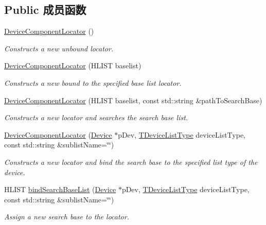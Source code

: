 \subsection*{Public 成员函数}
\begin{DoxyCompactItemize}
\item 
\hypertarget{classmv_i_m_p_a_c_t_1_1acquire_1_1_device_component_locator_a00b45d983915c661f03a7892c25824f1}{\hyperlink{classmv_i_m_p_a_c_t_1_1acquire_1_1_device_component_locator_a00b45d983915c661f03a7892c25824f1}{Device\+Component\+Locator} ()}\label{classmv_i_m_p_a_c_t_1_1acquire_1_1_device_component_locator_a00b45d983915c661f03a7892c25824f1}

\begin{DoxyCompactList}\small\item\em Constructs a new unbound locator. \end{DoxyCompactList}\item 
\hyperlink{classmv_i_m_p_a_c_t_1_1acquire_1_1_device_component_locator_a8db2e7b26c4c9a085d1b62fd2d0d72f2}{Device\+Component\+Locator} (H\+L\+I\+S\+T baselist)
\begin{DoxyCompactList}\small\item\em Constructs a new bound to the specified base list locator. \end{DoxyCompactList}\item 
\hyperlink{classmv_i_m_p_a_c_t_1_1acquire_1_1_device_component_locator_a8c467c39ece5e330e2ac77a0c0b1477c}{Device\+Component\+Locator} (H\+L\+I\+S\+T baselist, const std\+::string \&path\+To\+Search\+Base)
\begin{DoxyCompactList}\small\item\em Constructs a new locator and searches the search base list. \end{DoxyCompactList}\item 
\hyperlink{classmv_i_m_p_a_c_t_1_1acquire_1_1_device_component_locator_aa5bbd8bef10129bc482813c7c6210e1e}{Device\+Component\+Locator} (\hyperlink{classmv_i_m_p_a_c_t_1_1acquire_1_1_device}{Device} $\ast$p\+Dev, \hyperlink{group___common_interface_ga0dca79bbf0803a4ecec16d6cbb1a3dbb}{T\+Device\+List\+Type} device\+List\+Type, const std\+::string \&sublist\+Name=\char`\"{}\char`\"{})
\begin{DoxyCompactList}\small\item\em Constructs a new locator and bind the search base to the specified list type of the device. \end{DoxyCompactList}\item 
H\+L\+I\+S\+T \hyperlink{classmv_i_m_p_a_c_t_1_1acquire_1_1_device_component_locator_af77f54da12e74ce5100afbb8cd8b12c7}{bind\+Search\+Base\+List} (\hyperlink{classmv_i_m_p_a_c_t_1_1acquire_1_1_device}{Device} $\ast$p\+Dev, \hyperlink{group___common_interface_ga0dca79bbf0803a4ecec16d6cbb1a3dbb}{T\+Device\+List\+Type} device\+List\+Type, const std\+::string \&sublist\+Name=\char`\"{}\char`\"{})
\begin{DoxyCompactList}\small\item\em Assign a new search base to the locator. \end{DoxyCompactList}\end{DoxyCompactItemize}
